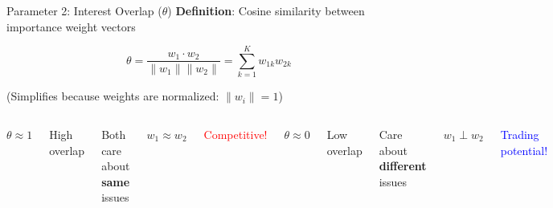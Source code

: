 \documentclass{beamer}
\begin{document}
\begin{frame}{Parameter 2: Interest Overlap ($\theta$)}
\textbf{Definition}: Cosine similarity between importance weight vectors

\begin{equation*}
\theta = \frac{w_1 \cdot w_2}{\|w_1\| \|w_2\|} = \sum_{k=1}^{K} w_{1k} w_{2k}
\end{equation*}

(Simplifies because weights are normalized: $\|w_i\| = 1$)

\vspace{0.5cm}

\begin{columns}
\centering
\textbf{$\theta \approx 1$}

High overlap

\vspace{0.2cm}

Both care about \textbf{same} issues

\vspace{0.2cm}

$w_1 \approx w_2$

\vspace{0.2cm}

\textcolor{red}{Competitive!}

\centering
\textbf{$\theta \approx 0$}

Low overlap

\vspace{0.2cm}

Care about \textbf{different} issues

\vspace{0.2cm}

$w_1 \perp w_2$

\vspace{0.2cm}

\textcolor{blue}{Trading potential!}
\end{columns}
\end{frame}
\end{document}

